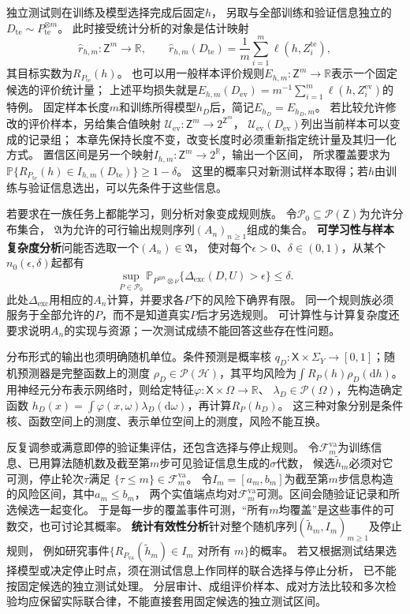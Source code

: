 独立测试则在训练及模型选择完成后固定$h$，
另取与全部训练和验证信息独立的$D_{\mathrm{te}}\sim P_{\mathrm{te}}^{\otimes m}$。
此时接受统计分析的对象是估计映射
\[
  \widehat r_{h,m}:\mathsf Z^m\to\mathbb R,
  \qquad \widehat r_{h,m}(D_{\mathrm{te}})
       =\frac1m\sum_{i=1}^m\ell(h,Z_i^{\mathrm{te}}),
\]
其目标实数为$R_{P_{\mathrm{te}}}(h)$。
也可以用一般样本评价规则$E_{h,m}:\mathsf Z^m\to\mathbb R$表示一个固定候选的评价统计量；
上述平均损失就是$E_{h,m}(D_{\mathrm{ev}})=m^{-1}\sum_{i=1}^m\ell(h,Z_i^{\mathrm{ev}})$的特例。
固定样本长度$m$和训练所得模型$h_D$后，简记$E_{h_D}=E_{h_D,m}$。
若比较允许修改的评价样本，另给集合值映射
$\mathcal U_{\mathrm{ev}}:\mathsf Z^m\to2^{\mathsf Z^m}$，
$\mathcal U_{\mathrm{ev}}(D_{\mathrm{ev}})$列出当前样本可以变成的记录组；
本章先保持长度不变，改变长度时必须重新指定统计量及其归一化方式。
置信区间是另一个映射$I_{h,m}:\mathsf Z^m\to2^{\mathbb R}$，输出一个区间，
所求覆盖要求为$\mathbb P\{R_{P_{\mathrm{te}}}(h)\in I_{h,m}(D_{\mathrm{te}})\}\geq1-\delta$。
这里的概率只对新测试样本取得；若$h$由训练与验证信息选出，可以先条件于这些信息。

若要求在一族任务上都能学习，则分析对象变成规则族。
令$\mathcal P_0\subseteq\mathcal P(\mathsf Z)$为允许分布集合，
$\mathfrak A$为允许的可行输出规则序列$(A_n)_{n\geq1}$组成的集合。
\textbf{可学习性与样本复杂度分析}问能否选取一个$(A_n)\in\mathfrak A$，
使对每个$\epsilon>0$、$\delta\in(0,1)$，从某个$n_0(\epsilon,\delta)$起都有
\[
  \sup_{P\in\mathcal P_0}
  \mathbb P_{P^{\otimes n}\otimes\nu}
       \{\Delta_{\mathrm{exc}}(D,U)>\epsilon\}\leq\delta.
\]
此处$\Delta_{\mathrm{exc}}$用相应的$A_n$计算，并要求各$P$下的风险下确界有限。
同一个规则族必须服务于全部允许的$P$，而不是知道真实$P$后才另选规则。
可计算性与计算复杂度还要求说明$A_n$的实现与资源；一次测试成绩不能回答这些存在性问题。

分布形式的输出也须明确随机单位。条件预测是概率核
$q_D:\mathsf X\times\Sigma_Y\to[0,1]$；随机预测器是完整函数上的测度
$\rho_D\in\mathcal P(\mathcal H)$，其平均风险为$\int R_P(h)\rho_D(\mathrm dh)$。
用神经元分布表示网络时，则给定特征$\varphi:\mathsf X\times\Omega\to\mathbb R$、
$\lambda_D\in\mathcal P(\Omega)$，先构造确定函数
$h_D(x)=\int\varphi(x,\omega)\lambda_D(\mathrm d\omega)$，再计算$R_P(h_D)$。
这三种对象分别是条件核、函数空间上的测度、表示单位空间上的测度，风险不能互换。

反复调参或满意即停的验证集评估，还包含选择与停止规则。
令$\mathcal F_m^{\mathrm{va}}$为训练信息、已用算法随机数及截至第$m$步可见验证信息生成的$\sigma$代数，
候选$\widetilde h_m$必须对它可测，停止轮次$\tau$满足
$\{\tau\leq m\}\in\mathcal F_m^{\mathrm{va}}$。
令$I_m=[a_m,b_m]$为截至第$m$步信息构造的风险区间，其中$a_m\leq b_m$，
两个实值端点均对$\mathcal F_m^{\mathrm{va}}$可测。区间会随验证记录和所选候选一起变化。
于是每一步的覆盖事件可测，“所有$m$均覆盖”是这些事件的可数交，也可讨论其概率。
\textbf{统计有效性分析}针对整个随机序列$(\widetilde h_m,I_m)_{m\geq1}$及停止规则，
例如研究事件$\{R_{P_{\mathrm{va}}}(\widetilde h_m)\in I_m\text{ 对所有 }m\}$的概率。
若又根据测试结果选择模型或决定停止时点，须在测试信息上作同样的联合选择与停止分析，
已不能按固定候选的独立测试处理。
分层审计、成组评价样本、成对方法比较和多次检验均应保留实际联合律，不能直接套用固定候选的独立测试区间。

